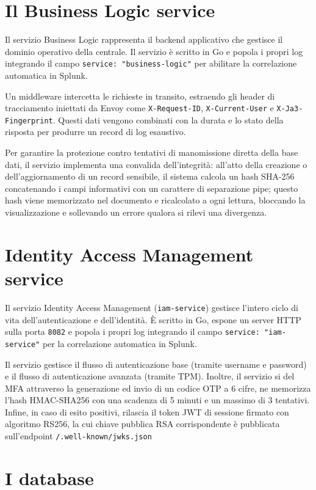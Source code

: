 \section{Il Business Logic service}

Il servizio Business Logic rappresenta il backend applicativo che gestisce il dominio operativo della centrale. Il servizio è scritto in Go e popola i propri log integrando il campo \texttt{service: "business-logic"} per abilitare la correlazione automatica in Splunk.

Un middleware intercetta le richieste in transito, estraendo gli header di tracciamento iniettati da Envoy come \texttt{X-Request-ID}, \texttt{X-Current-User} e \texttt{X-Ja3-Fingerprint}. Questi dati vengono combinati con la durata e lo stato della risposta per produrre un record di log esaustivo.

Per garantire la protezione contro tentativi di manomissione diretta della base dati, il servizio implementa una convalida dell'integrità: all'atto della creazione o dell'aggiornamento di un record sensibile, il sistema calcola un hash SHA-256 concatenando i campi informativi con un carattere di separazione pipe; questo hash viene memorizzato nel documento e ricalcolato a ogni lettura, bloccando la visualizzazione e sollevando un errore qualora si rilevi una divergenza.

\section{Identity Access Management service}
Il servizio Identity Access Management (\texttt{iam-service}) gestisce l'intero ciclo di vita dell'autenticazione e dell'identità. È scritto in Go, espone un server HTTP sulla porta \texttt{8082} e popola i propri log integrando il campo \texttt{service: "iam-service"} per la correlazione automatica in Splunk.

Il servizio gestisce il flusso di autenticazione base (tramite username e password) e il flusso di autenticazione avanzata (tramite TPM). Inoltre, il servizio si del MFA attraverso la  generazione ed invio di un codice OTP a 6 cifre, ne memorizza l'hash HMAC-SHA256 con una scadenza di 5 minuti e un massimo di 3 tentativi. Infine, in caso di esito positivi, rilascia il token JWT di sessione firmato con algoritmo RS256, la cui chiave pubblica RSA corrispondente è pubblicata sull'endpoint \texttt{/.well-known/jwks.json}

\section{I database}

